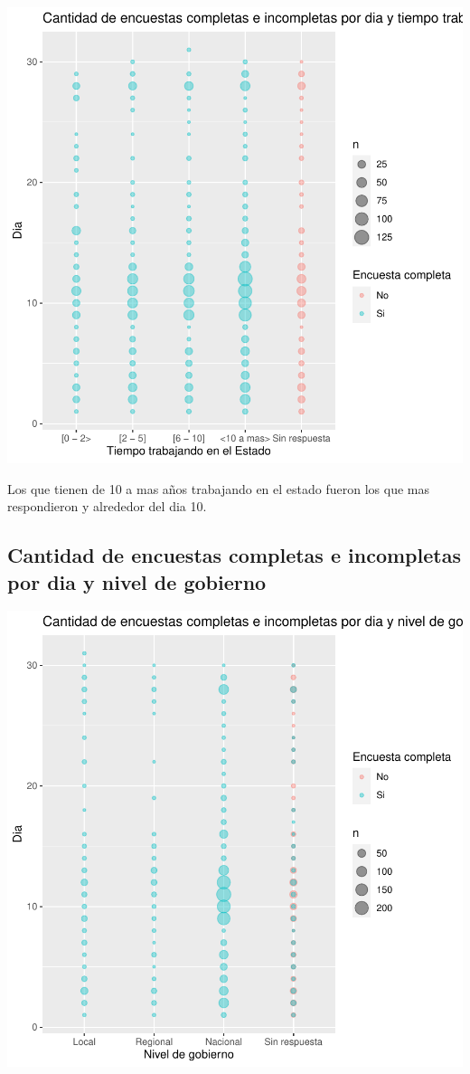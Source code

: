 \documentclass{article}
\begin{document}
\includegraphics{seguimientov3-018}

Los que tienen de 10 a mas años trabajando en el estado fueron los que mas respondieron y alrededor del dia 10.

\subsection{Cantidad de encuestas completas e incompletas por dia y nivel de gobierno}

\includegraphics{seguimientov3-019}
\end{document}
